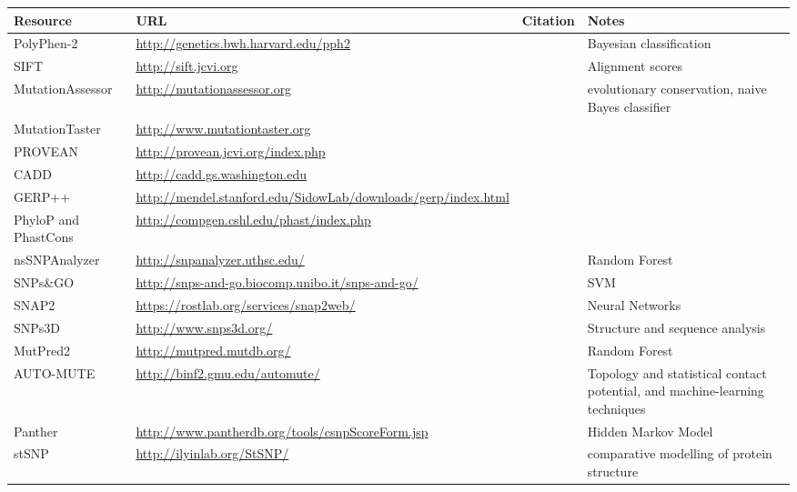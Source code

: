 \documentclass{article}
\begin{document}
\begin{table}[p]
\centering
\begin{tabularx}{1.1\textwidth}{p{2.5cm}Xp{3.5cm}p{3.5cm}}
  \hline
Resource & URL & Citation & Notes \\
  \hline
  PolyPhen-2 & \url{http://genetics.bwh.harvard.edu/pph2} & \parencite{Adzhubei2013-nj} & Bayesian classification \\
  SIFT & \url{http://sift.jcvi.org} & \parencite{Ng2003-vp} & Alignment scores \\
  MutationAssessor & \url{http://mutationassessor.org} & \parencite{Reva2011-en} & evolutionary conservation,  naive Bayes classifier \\
  MutationTaster & \url{http://www.mutationtaster.org} & \parencite{Schwarz2014-ep} &   \\
  PROVEAN & \url{http://provean.jcvi.org/index.php} & \parencite{Choi2012-tk} &   \\
  CADD & \url{http://cadd.gs.washington.edu} & \parencite{Kircher2014-im} &   \\
  GERP++ & \url{http://mendel.stanford.edu/SidowLab/downloads/gerp/index.html} & \parencite{Davydov2010-ui} &   \\
  PhyloP and PhastCons & \url{http://compgen.cshl.edu/phast/index.php} & \parencite{Siepel2005-ke,Pollard2010-of} &   \\
  nsSNPAnalyzer & \url{http://snpanalyzer.uthsc.edu/} & \parencite{Bao2005-jn} & Random Forest \\
  SNPs\&GO & \url{http://snps-and-go.biocomp.unibo.it/snps-and-go/} & \parencite{Calabrese2009-mi} & SVM \\
  SNAP2 & \url{https://rostlab.org/services/snap2web/} & \parencite{Hecht2015-ti} & Neural Networks \\
  SNPs3D & \url{http://www.snps3d.org/} & \parencite{Yue2006-kj} & Structure and sequence analysis \\
  MutPred2 & \url{http://mutpred.mutdb.org/} & \parencite{Pejaver2017-lr} & Random Forest \\
  AUTO-MUTE & \url{http://binf2.gmu.edu/automute/} & \parencite{Masso2010-gf} & Topology  and statistical contact potential, and machine-learning techniques \\ 
  Panther & \url{http://www.pantherdb.org/tools/csnpScoreForm.jsp} & \parencite{Thomas2003-rj} & Hidden Markov Model \\
  stSNP & \url{http://ilyinlab.org/StSNP/} & \parencite{Uzun2007-bk} & comparative modelling of protein structure \\

\end{tabularx}
\end{table}
\end{document}
